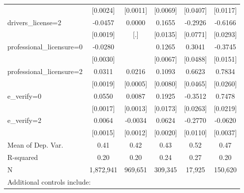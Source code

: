 \begin{table}[htbp]
\begin{tabular}{l*{5}{c}}
                    &    [0.0024]         &    [0.0011]         &    [0.0069]         &    [0.0407]         &    [0.0117]         \\
\addlinespace
drivers\_license=2   &     -0.0457\sym{***}&      0.0000         &      0.1655\sym{***}&     -0.2926\sym{***}&     -0.6166\sym{***}\\
                    &    [0.0019]         &         [.]         &    [0.0135]         &    [0.0771]         &    [0.0293]         \\
\addlinespace
professional\_licensure=0&     -0.0280\sym{***}&                     &      0.1265\sym{***}&      0.3041\sym{***}&     -0.3745\sym{***}\\
                    &    [0.0030]         &                     &    [0.0067]         &    [0.0488]         &    [0.0151]         \\
\addlinespace
professional\_licensure=2&      0.0311\sym{***}&      0.0216\sym{***}&      0.1093\sym{***}&      0.6623\sym{***}&      0.7834\sym{***}\\
                    &    [0.0019]         &    [0.0005]         &    [0.0080]         &    [0.0465]         &    [0.0260]         \\
\addlinespace
e\_verify=0          &      0.0550\sym{***}&      0.0087\sym{***}&      0.1925\sym{***}&     -0.3512\sym{***}&      0.7478\sym{***}\\
                    &    [0.0017]         &    [0.0013]         &    [0.0173]         &    [0.0263]         &    [0.0219]         \\
\addlinespace
e\_verify=2          &      0.0064\sym{***}&     -0.0034\sym{**} &      0.0624\sym{***}&     -0.2770\sym{***}&     -0.0620\sym{***}\\
                    &    [0.0015]         &    [0.0012]         &    [0.0020]         &    [0.0110]         &    [0.0037]         \\
\midrule
Mean of Dep. Var.   &        0.41         &        0.42         &        0.43         &        0.52         &        0.47         \\
R-squared           &        0.20         &        0.20         &        0.24         &        0.27         &        0.20         \\
N                   &   1,872,941         &     969,651         &     309,345         &      17,925         &     150,620         \\
\bottomrule
\multicolumn{6}{l}{\footnotesize Additional controls include:}\\

\end{tabular}
\end{table}
